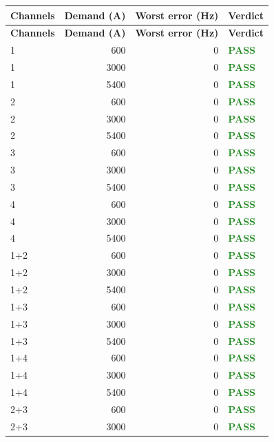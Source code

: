 \documentclass[11pt]{article}
\begin{document}
\begin{center}
\begin{longtable}{l r r l}
\hline
\textbf{Channels} & \textbf{Demand (A)} & \textbf{Worst error (Hz)} & \textbf{Verdict} \\
\hline
\endfirsthead
\hline
\textbf{Channels} & \textbf{Demand (A)} & \textbf{Worst error (Hz)} & \textbf{Verdict} \\
\hline
\endhead
1 & 600 & 0 & \textcolor{ForestGreen}{\textbf{PASS}} \\
1 & 3000 & 0 & \textcolor{ForestGreen}{\textbf{PASS}} \\
1 & 5400 & 0 & \textcolor{ForestGreen}{\textbf{PASS}} \\
2 & 600 & 0 & \textcolor{ForestGreen}{\textbf{PASS}} \\
2 & 3000 & 0 & \textcolor{ForestGreen}{\textbf{PASS}} \\
2 & 5400 & 0 & \textcolor{ForestGreen}{\textbf{PASS}} \\
3 & 600 & 0 & \textcolor{ForestGreen}{\textbf{PASS}} \\
3 & 3000 & 0 & \textcolor{ForestGreen}{\textbf{PASS}} \\
3 & 5400 & 0 & \textcolor{ForestGreen}{\textbf{PASS}} \\
4 & 600 & 0 & \textcolor{ForestGreen}{\textbf{PASS}} \\
4 & 3000 & 0 & \textcolor{ForestGreen}{\textbf{PASS}} \\
4 & 5400 & 0 & \textcolor{ForestGreen}{\textbf{PASS}} \\
1+2 & 600 & 0 & \textcolor{ForestGreen}{\textbf{PASS}} \\
1+2 & 3000 & 0 & \textcolor{ForestGreen}{\textbf{PASS}} \\
1+2 & 5400 & 0 & \textcolor{ForestGreen}{\textbf{PASS}} \\
1+3 & 600 & 0 & \textcolor{ForestGreen}{\textbf{PASS}} \\
1+3 & 3000 & 0 & \textcolor{ForestGreen}{\textbf{PASS}} \\
1+3 & 5400 & 0 & \textcolor{ForestGreen}{\textbf{PASS}} \\
1+4 & 600 & 0 & \textcolor{ForestGreen}{\textbf{PASS}} \\
1+4 & 3000 & 0 & \textcolor{ForestGreen}{\textbf{PASS}} \\
1+4 & 5400 & 0 & \textcolor{ForestGreen}{\textbf{PASS}} \\
2+3 & 600 & 0 & \textcolor{ForestGreen}{\textbf{PASS}} \\
2+3 & 3000 & 0 & \textcolor{ForestGreen}{\textbf{PASS}} \\

\end{longtable}
\end{center}
\end{document}
